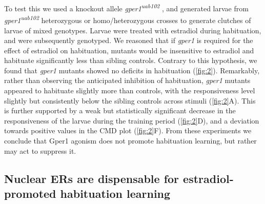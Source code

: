 \documentclass[10pt,lineno]{RandlettLab_elife}
\begin{document}
{To test this we used a knockout allele \emph{gper1\textsuperscript{uab102}} \citep{Romano2017-ep}, and generated larvae from \emph{gper1\textsuperscript{uab102}} heterozygous or homo/heterozygous crosses to generate clutches of larvae of mixed genotypes. 
Larvae were treated with estradiol during habituation, and were subsequently genotyped. 
We reasoned that if \emph{gper1} is required for the effect of estradiol on habituation, mutants would be insensitive to estradiol and habituate significantly less than sibling controls. 
Contrary to this hypothesis, we found that \emph{gper1} mutants showed no deficits in habituation (\autoref{fig:2}). 
Remarkably, rather than observing the anticipated inhibition of habituation, \emph{gper1} mutants appeared to habituate slightly more than controls, with the responsiveness level slightly but consistently below the sibling controls across stimuli (\autoref{fig:2}A). 
This is further supported by a weak but statistically significant decrease in the responsiveness of the larvae during the training period (\autoref{fig:2}D), and a deviation towards positive values in the CMD plot (\autoref{fig:2}F). 
From these experiments we conclude that Gper1 agonism does not promote habituation learning, but rather may act to suppress it.  


\subsection{Nuclear ERs are dispensable for estradiol-promoted habituation learning}

}
\end{document}
